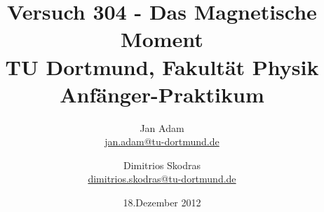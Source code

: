 

\usepackage{float}
\usepackage{caption}
\usepackage{wrapfig}
\usepackage{setspace}
\usepackage{threeparttable}
\usepackage{footnote}



\title{Versuch 304 - Das Magnetische Moment\\				%
\large TU Dortmund, Fakultät Physik\\ 
\normalsize Anfänger-Praktikum}

\author{Jan Adam\\			%
{\small \href{jan.adam@tu-dortmund.de}{jan.adam@tu-dortmund.de}}	%
\and						%
Dimitrios Skodras\\					%
{\small \href{dimitrios.skodras@tu-dortmund.de}{dimitrios.skodras@tu-dortmund.de}}		%
}
\date{18.Dezember 2012}				%





\maketitle					%
\thispagestyle{empty} 				%



\tableofcontents


